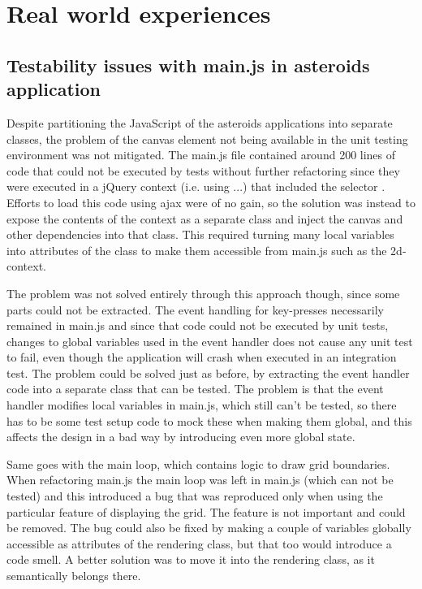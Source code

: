 \documentclass[11pt]{article}
\begin{document}
\section{Real world experiences}

\subsection{Testability issues with main.js in asteroids application}
\label{sec:asteroids}

Despite partitioning the JavaScript of the asteroids applications into separate classes, the problem of the canvas element not being available in the unit testing environment was not mitigated. The main.js file contained around 200 lines of code that could not be executed by tests without further refactoring since they were executed in a jQuery context (i.e. using \jquerycontext...) that included the selector \selector. Efforts to load this code using ajax were of no gain, so the solution was instead to expose the contents of the context as a separate class and inject the canvas and other dependencies into that class. This required turning many local variables into attributes of the class to make them accessible from main.js such as the 2d-context.

The problem was not solved entirely through this approach though, since some parts could not be extracted. The event handling for key-presses necessarily remained in main.js and since that code could not be executed by unit tests, changes to global variables used in the event handler does not cause any unit test to fail, even though the application will crash when executed in an integration test. The problem could be solved just as before, by extracting the event handler code into a separate class that can be tested. The problem is that the event handler modifies local variables in main.js, which still can't be tested, so there has to be some test setup code to mock these when making them global, and this affects the design in a bad way by introducing even more global state.

Same goes with the main loop, which contains logic to draw grid boundaries. When refactoring main.js the main loop was left in main.js (which can not be tested) and this introduced a bug that was reproduced only when using the particular feature of displaying the grid. The feature is not important and could be removed. The bug could also be fixed by making a couple of variables globally accessible as attributes of the rendering class, but that too would introduce a code smell. A better solution was to move it into the rendering class, as it semantically belongs there.
\end{document}
